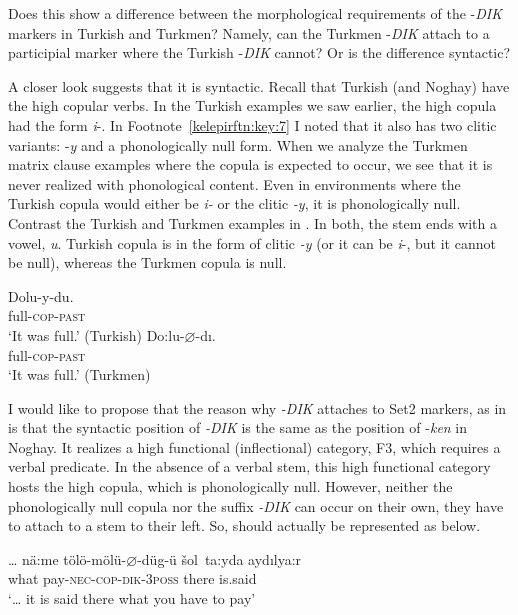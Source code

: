 \documentclass[output=paper]{langsci/langscibook}
\begin{document}
Does this show a difference between the morphological requirements of the -\textit{DIK} markers in Turkish and Turkmen? 
Namely, can the Turkmen -\textit{DIK} attach to a participial marker where the Turkish -\textit{DIK} cannot? 
Or is the difference syntactic?

A closer look suggests that it is syntactic. 
Recall that Turkish (and Noghay) have the high copular verbs. 
In the Turkish examples we saw earlier, the high copula had the form \textit{i}{}-. 
In Footnote~\ref{kelepirftn:key:7} I noted that it also has two clitic variants: -\textit{y} and a phonologically null form. 
When we analyze the Turkmen matrix clause examples where the copula is expected to occur, we see that it is never realized with phonological content. 
Even in environments where the Turkish copula would either be \textit{i-} or the clitic \textit{{}-y}, it is phonologically null. 
Contrast the Turkish and Turkmen examples in . 
In both, the stem ends with a vowel, \textit{u}. 
Turkish copula is in the form of clitic \textit{{}-y} (or it can be \textit{i}{}-, but it cannot be null), whereas the Turkmen copula is null. 

\ea \label{kelepirex:key:22}
    \begin{multicols}{2}
    \ea 
        \gll Dolu-y-du.\\
        full-\textsc{cop}{}-\textsc{past}\\
        \glt `It was full.' (Turkish)
    \ex \label{kelepirex:key:22b}
        \gll Do:lu-$\varnothing$-dı. \\
        full-\textsc{cop}{}-\textsc{past} \\
        \glt `It was full.'   \citep[239]{Clark1998} (Turkmen)
    \z
\end{multicols}
\z 

I would like to propose that the reason why \textit{-DIK} attaches to Set2 markers, as in  is that the syntactic position of \textit{-DIK} is the same as the position of -\textit{ken} in Noghay. 
It realizes a high functional (inflectional) category, F3, which requires a verbal predicate. 
In the absence of a verbal stem, this high functional category hosts the high copula, which is phonologically null. 
However, neither the phonologically null copula nor the suffix \textit{-DIK} can occur on their own, they have to attach to a stem to their left. 
So,  should actually be represented as  below.

\ea%
    \label{kelepirex:key:23}
    \gll \ldots{} nä:me tölö-mölü-$\varnothing$-düg-ü šol~ta:yda aydılya:r \\
    {} what pay-\textsc{nec}-\textsc{cop}-\textsc{dik}-\textsc{3poss} there is.said \\
    \glt `\ldots{} it is said there what you have to pay' 
\z
\end{document}

